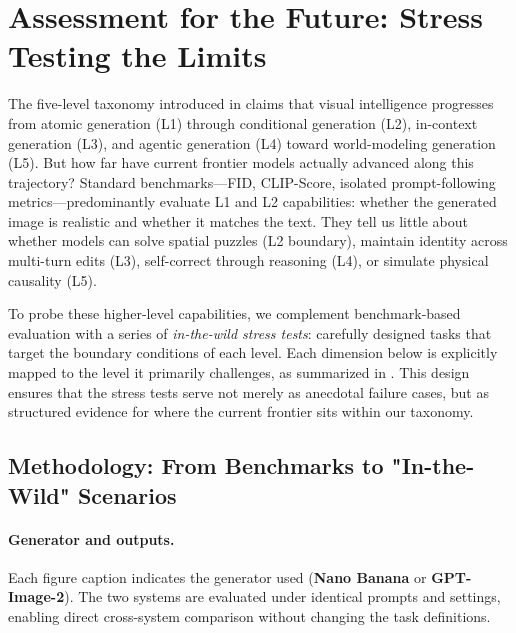 \section{Assessment for the Future: Stress Testing the Limits}
\label{sec:stress_test}



The five-level taxonomy introduced in  claims that visual intelligence progresses from atomic generation (L1) through conditional generation (L2), in-context generation (L3), and agentic generation (L4) toward world-modeling generation (L5). But how far have current frontier models actually advanced along this trajectory? Standard benchmarks---FID, CLIP-Score, isolated prompt-following metrics---predominantly evaluate L1 and L2 capabilities: whether the generated image is realistic and whether it matches the text. They tell us little about whether models can solve spatial puzzles (L2 boundary), maintain identity across multi-turn edits (L3), self-correct through reasoning (L4), or simulate physical causality (L5).

To probe these higher-level capabilities, we complement benchmark-based evaluation with a series of \emph{in-the-wild stress tests}: carefully designed tasks that target the boundary conditions of each level. Each dimension below is explicitly mapped to the level it primarily challenges, as summarized in . This design ensures that the stress tests serve not merely as anecdotal failure cases, but as structured evidence for where the current frontier sits within our taxonomy.

\subsection{Methodology: From Benchmarks to "In-the-Wild" Scenarios}

\paragraph{Generator and outputs.}
Each figure caption indicates the generator used (\textbf{Nano Banana} or \textbf{GPT-Image-2}). The two systems are evaluated under identical prompts and settings, enabling direct cross-system comparison without changing the task definitions.

